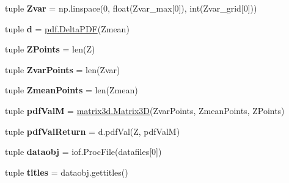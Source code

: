 \begin{DoxyCompactItemize}
\item 
\hypertarget{namespacechemtable__io_ace8e791769d023de99174257cedfdb5f}{
tuple {\bfseries Zvar} = np.linspace(0, float(Zvar\_\-max\mbox{[}0\mbox{]}), int(Zvar\_\-grid\mbox{[}0\mbox{]}))}
\label{dc/dad/namespacechemtable__io_ace8e791769d023de99174257cedfdb5f}

\item 
\hypertarget{namespacechemtable__io_a56545484288b58088acf84b5275aeaaa}{
tuple {\bfseries d} = \hyperlink{classpdf_1_1DeltaPDF}{pdf.DeltaPDF}(Zmean)}
\label{dc/dad/namespacechemtable__io_a56545484288b58088acf84b5275aeaaa}

\item 
\hypertarget{namespacechemtable__io_ace5df4033fc35f3e8aed40f5f6ee89b0}{
tuple {\bfseries ZPoints} = len(Z)}
\label{dc/dad/namespacechemtable__io_ace5df4033fc35f3e8aed40f5f6ee89b0}

\item 
\hypertarget{namespacechemtable__io_a78a16806aac907a787c3fffcd3e13597}{
tuple {\bfseries ZvarPoints} = len(Zvar)}
\label{dc/dad/namespacechemtable__io_a78a16806aac907a787c3fffcd3e13597}

\item 
\hypertarget{namespacechemtable__io_ab3cfeac33d3218dcc4930f879e03c13c}{
tuple {\bfseries ZmeanPoints} = len(Zmean)}
\label{dc/dad/namespacechemtable__io_ab3cfeac33d3218dcc4930f879e03c13c}

\item 
\hypertarget{namespacechemtable__io_ae2ba489f5e7a51ab83f6e4c9a8525d0a}{
tuple {\bfseries pdfValM} = \hyperlink{classmatrix3d_1_1Matrix3D}{matrix3d.Matrix3D}(ZvarPoints, ZmeanPoints, ZPoints)}
\label{dc/dad/namespacechemtable__io_ae2ba489f5e7a51ab83f6e4c9a8525d0a}

\item 
\hypertarget{namespacechemtable__io_a8a896397eb470a39119083c8e49fb164}{
tuple {\bfseries pdfValReturn} = d.pdfVal(Z, pdfValM)}
\label{dc/dad/namespacechemtable__io_a8a896397eb470a39119083c8e49fb164}

\item 
\hypertarget{namespacechemtable__io_aeb71c57d6d074ae0d184320d30db5725}{
tuple {\bfseries dataobj} = iof.ProcFile(datafiles\mbox{[}0\mbox{]})}
\label{dc/dad/namespacechemtable__io_aeb71c57d6d074ae0d184320d30db5725}

\item 
\hypertarget{namespacechemtable__io_af7f8849bcbb13db397d5ce46c978d529}{
tuple {\bfseries titles} = dataobj.gettitles()}
\label{dc/dad/namespacechemtable__io_af7f8849bcbb13db397d5ce46c978d529}


\end{DoxyCompactItemize}

